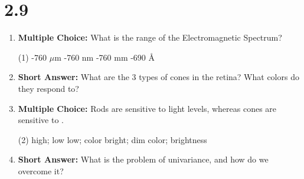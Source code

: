 \squigglyline


\section*{2.9}

\begin{enumerate}[label=\textbf{Q2.9.\arabic*}]
      \item \textbf{Multiple Choice:} What is the range of the Electromagnetic Spectrum?
            \begin{tasks}[label=\textcolor{draculafg}{(\Alph*)}, item-format=\color{draculafg}, label-width=1.5em, item-indent=1.7em](1)
                  -760 \(\mu\)m
                  -760 nm
                  -760 mm
                  -690 \AA
            \end{tasks}

      \item \textbf{Short Answer:} What are the 3 types of cones in the retina? What colors do they respond to? \\

      \item \textbf{Multiple Choice:} Rods are sensitive to \underline{\hspace{3cm}} light levels, whereas cones are sensitive to \underline{\hspace{3cm}}. 
            \begin{tasks}[label=\textcolor{draculafg}{(\Alph*)}, item-format=\color{draculafg}, label-width=1.5em, item-indent=1.7em](2)
                  \task high; low
                  \task low; color
                  \task bright; dim
                  \task color; brightness
            \end{tasks}

      \item \textbf{Short Answer:} What is the problem of univariance, and how do we overcome it? \\


\end{enumerate}
